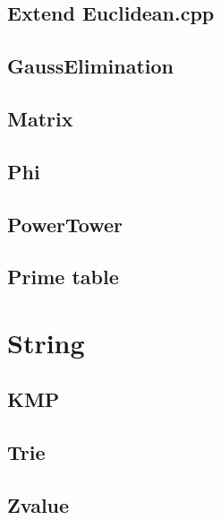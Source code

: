 \subsection{Extend Euclidean.cpp}

\subsection{GaussElimination}

\subsection{Matrix}

\subsection{Phi}

\subsection{PowerTower}

\subsection{Prime table}


\section{String}

\subsection{KMP}

\subsection{Trie}

\subsection{Zvalue}
